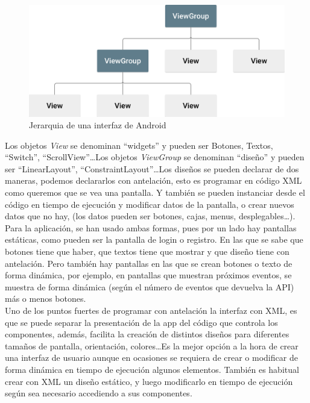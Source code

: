 \begin{figure}[h!]
  \centering
  \includegraphics[width=0.75\linewidth]{figs/Desarrollo/Jerarquia}
  \caption[Android Layout]{Jerarquia de una interfaz de Android}
  \label{fig:interfaz_android}
\end{figure}

Los objetos \emph{View} se denominan ``widgets'' y pueden ser Botones, Textos, ``Switch'', ``ScrollView''\dots Los objetos \emph{ViewGroup} se denominan ``diseño'' y pueden ser ``LinearLayout'', ``ConstraintLayout''\dots Los diseños se pueden declarar de dos maneras, podemos declararlos con antelación, esto es programar en código XML como queremos que se vea una pantalla. Y también se pueden instanciar desde el código en tiempo de ejecución y modificar datos de la pantalla, o crear nuevos datos que no hay, (los datos pueden ser botones, cajas, menus, desplegables\dots). \\

Para la aplicación, se han usado ambas formas, pues por un lado hay pantallas estáticas, como pueden ser la pantalla de login o registro. En las que se sabe que botones tiene que haber, que textos tiene que mostrar y que diseño tiene con antelación. Pero también hay pantallas en las que se crean botones o texto de forma dinámica, por ejemplo, en pantallas que muestran próximos eventos, se muestra de forma dinámica (según el número de eventos que devuelva la API) más o menos botones. \\

Uno de los puntos fuertes de programar con antelación la interfaz con XML, es que se puede separar la presentación de la app del código que controla los componentes, además, facilita la creación de distintos diseños para diferentes tamaños de pantalla, orientación, colores\dots Es la mejor opción a la hora de crear una interfaz de usuario aunque en ocasiones se requiera de crear o modificar de forma dinámica en tiempo de ejecución algunos elementos. También es habitual crear con XML un diseño estático, y luego modificarlo en tiempo de ejecución según sea necesario accediendo a sus componentes.  

